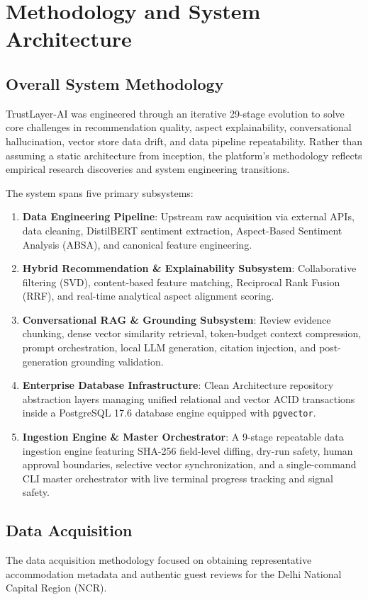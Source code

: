 \chapter{Methodology and System Architecture}\label{ch:methodology}

\section{Overall System Methodology}
TrustLayer-AI was engineered through an iterative 29-stage evolution to solve core challenges in recommendation quality, aspect explainability, conversational hallucination, vector store data drift, and data pipeline repeatability. Rather than assuming a static architecture from inception, the platform's methodology reflects empirical research discoveries and system engineering transitions.

The system spans five primary subsystems:
\begin{enumerate}
    \item \textbf{Data Engineering Pipeline}: Upstream raw acquisition via external APIs, data cleaning, DistilBERT sentiment extraction, Aspect-Based Sentiment Analysis (ABSA), and canonical feature engineering.
    \item \textbf{Hybrid Recommendation \& Explainability Subsystem}: Collaborative filtering (SVD), content-based feature matching, Reciprocal Rank Fusion (RRF), and real-time analytical aspect alignment scoring.
    \item \textbf{Conversational RAG \& Grounding Subsystem}: Review evidence chunking, dense vector similarity retrieval, token-budget context compression, prompt orchestration, local LLM generation, citation injection, and post-generation grounding validation.
    \item \textbf{Enterprise Database Infrastructure}: Clean Architecture repository abstraction layers managing unified relational and vector ACID transactions inside a PostgreSQL 17.6 database engine equipped with \texttt{pgvector}.
    \item \textbf{Ingestion Engine \& Master Orchestrator}: A 9-stage repeatable data ingestion engine featuring SHA-256 field-level diffing, dry-run safety, human approval boundaries, selective vector synchronization, and a single-command CLI master orchestrator with live terminal progress tracking and signal safety.
\end{enumerate}

\section{Data Acquisition}
The data acquisition methodology focused on obtaining representative accommodation metadata and authentic guest reviews for the Delhi National Capital Region (NCR).

